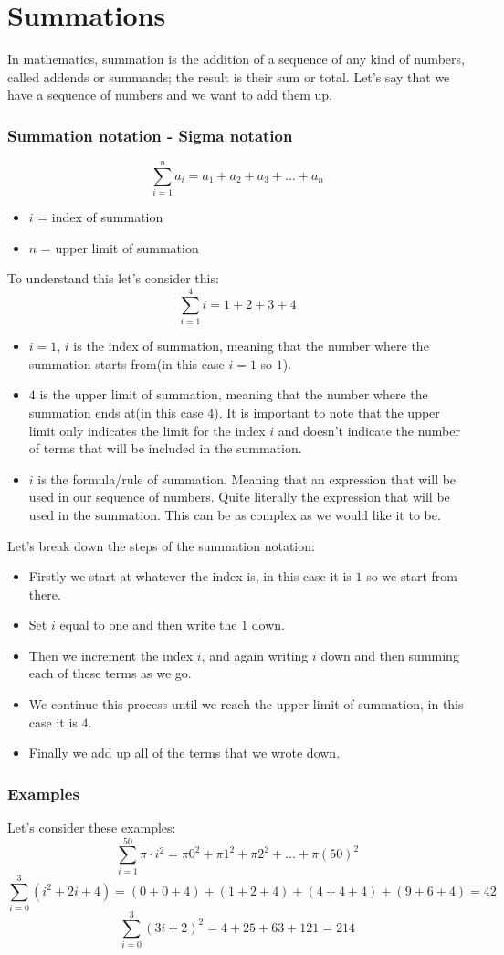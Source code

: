 




\section{Summations}
In mathematics, summation is the addition of a sequence of any kind of numbers, called addends or summands; the result is their sum or total. 
Let's say that we have a sequence of numbers and we want to add them up.

\subsubsection{Summation notation - Sigma notation}
$$  \sum_{i=1}^{n} a_i = a_1 + a_2 + a_3 + \ldots + a_n $$
\begin{itemize}
  \item $ i $ = index of summation
  \item $ n $ = upper limit of summation
\end{itemize}
To understand this let's consider this: 
$$ \sum_{i=1}^{4} i = 1 + 2 + 3 + 4$$
\begin{itemize}
  \item $ i = 1 $, $ i $ is the index of summation, meaning that the number where the summation starts from(in this case $ i = 1 $ so $1$).
  \item $ 4 $ is the upper limit of summation, meaning that the number where the summation ends at(in this case $ 4 $). It is important to note that the upper limit only indicates the limit for the index $i$ and doesn't indicate the number of terms that will be included in the summation.
  \item $ i $ is the formula/rule of summation. Meaning that an expression that will be used in our sequence of numbers. Quite literally the expression that will be used in the summation. This can be as complex as we would like it to be.
\end{itemize}

Let's break down the steps of the summation notation:
\begin{itemize}
  \item Firstly we start at whatever the index is, in this case it is $1$ so we start from there. 
  \item Set $i$ equal to one and then write the $1$ down. 
  \item Then we increment the index $i$, and again writing $i$ down and then summing each of these terms as we go.
  \item We continue this process until we reach the upper limit of summation, in this case it is $4$.
  \item Finally we add up all of the terms that we wrote down.
\end{itemize}

\subsubsection{Examples}
Let's consider these examples:
$$ \sum_{i = 1}^{50} \pi \cdot i^2  = \pi0^2 + \pi1^2 + \pi2^2 + \ldots + \pi(50)^2$$
$$ \sum_{i = 0}^{3} (i^2 + 2i + 4) = (0 + 0 + 4) + (1+2+4) + (4+4+4) + (9+6+4) = 42$$
$$ \sum_{i = 0}^{3} (3i + 2)^2 = 4+25+63+121 = 214$$
